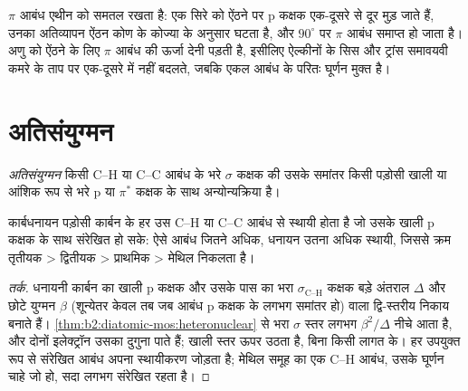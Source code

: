 $\pi$ आबंध एथीन को समतल रखता है: एक सिरे को ऐंठने पर p कक्षक एक-दूसरे से
दूर मुड़ जाते हैं, उनका अतिव्यापन ऐंठन कोण के कोज्या के अनुसार घटता है, और $90^\circ$ पर
$\pi$ आबंध समाप्त हो जाता है। अणु को ऐंठने के लिए $\pi$ आबंध की ऊर्जा देनी पड़ती है,
इसीलिए ऐल्कीनों के सिस और ट्रांस समावयवी कमरे के ताप पर एक-दूसरे में नहीं बदलते,
जबकि एकल आबंध के परितः घूर्णन मुक्त है।

\section{अतिसंयुग्मन}

\begin{definition}[अतिसंयुग्मन]\label{def:b2:fragment-orbitals:hyperconjugation}
\emph{अतिसंयुग्मन} किसी C--H या C--C आबंध के भरे
$\sigma$ कक्षक की उसके समांतर किसी पड़ोसी खाली या आंशिक रूप से भरे p
या $\pi^*$ कक्षक के साथ अन्योन्यक्रिया है।
\end{definition}

\begin{proposition}\label{prop:b2:fragment-orbitals:hyperconjugation}
कार्बधनायन पड़ोसी कार्बन के हर उस C--H या C--C आबंध से स्थायी होता है जो
उसके खाली p कक्षक के साथ संरेखित हो सके: ऐसे आबंध जितने अधिक, धनायन उतना
अधिक स्थायी, जिससे क्रम तृतीयक > द्वितीयक > प्राथमिक > मेथिल निकलता है।
\end{proposition}

\begin{proof}[तर्क]
धनायनी कार्बन का खाली p कक्षक और उसके पास का भरा $\sigma_{\text{C--H}}$ कक्षक
बड़े अंतराल $\Delta$ और छोटे युग्मन
$\beta$ (शून्येतर केवल तब जब आबंध p कक्षक के लगभग समांतर हो) वाला द्वि-स्तरीय निकाय बनाते हैं।
\cref{thm:b2:diatomic-mos:heteronuclear} से भरा $\sigma$ स्तर लगभग
$\beta^2/\Delta$ नीचे आता है, और दोनों इलेक्ट्रॉन उसका दुगुना पाते हैं; खाली स्तर ऊपर उठता है,
बिना किसी लागत के। हर उपयुक्त रूप से संरेखित आबंध अपना स्थायीकरण जोड़ता है; मेथिल समूह
का एक C--H आबंध, उसके घूर्णन चाहे जो हो, सदा लगभग संरेखित रहता है।
\end{proof}

